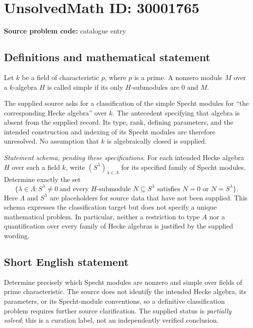 \documentclass[11pt]{article}
\begin{document}
\section*{UnsolvedMath ID: 30001765}
\textbf{Source problem code:} catalogue entry
\subsection{Definitions and mathematical statement}
Let \(k\) be a field of characteristic \(p\), where \(p\) is a prime. A nonzero module \(M\) over a \(k\)-algebra \(H\) is called simple if its only \(H\)-submodules are \(0\) and \(M\).

The supplied source asks for a classification of the simple Specht modules for ``the corresponding Hecke algebra'' over \(k\). The antecedent specifying that algebra is absent from the supplied record. Its type, rank, defining parameters, and the intended construction and indexing of its Specht modules are therefore unresolved. No assumption that \(k\) is algebraically closed is supplied.

\emph{Statement schema, pending these specifications.} For each intended Hecke algebra \(H\) over such a field \(k\), write \((S^\lambda)_{\lambda\in\Lambda}\) for its specified family of Specht modules. Determine exactly the set
\[
\bigl\{\lambda\in\Lambda : S^\lambda\ne 0\ \text{and every }H\text{-submodule }N\subseteq S^\lambda\text{ satisfies }N=0\text{ or }N=S^\lambda\bigr\}.
\]
Here \(\Lambda\) and \(S^\lambda\) are placeholders for source data that have not been supplied. This schema expresses the classification target but does not specify a unique mathematical problem. In particular, neither a restriction to type \(A\) nor a quantification over every family of Hecke algebras is justified by the supplied wording.
\subsection{Short English statement}
Determine precisely which Specht modules are nonzero and simple over fields of prime characteristic. The source does not identify the intended Hecke algebra, its parameters, or its Specht-module conventions, so a definitive classification problem requires further source clarification. The supplied status is \emph{partially solved}; this is a curation label, not an independently verified conclusion.
\end{document}
